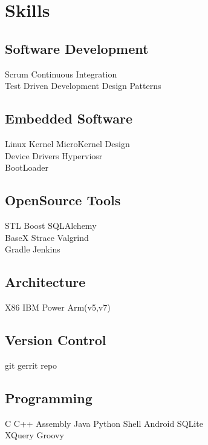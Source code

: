 \documentclass[letterpaper]{deedy-resume} %
\begin{document}
\begin{minipage}[t]{0.33\textwidth} %

\section{Skills}

\subsection{Software Development}
Scrum \textbullet{} Continuous Integration \textbullet{} \\
Test Driven Development \textbullet{} Design Patterns

\subsection{Embedded Software}
Linux Kernel \textbullet{} MicroKernel Design \textbullet{} \\
Device Drivers \textbullet{} Hyperviosr \textbullet{} \\
BootLoader

\subsection{OpenSource Tools}
STL \textbullet{} Boost \textbullet SQLAlchemy \textbullet \\
BaseX \textbullet{} Strace \textbullet{} Valgrind \textbullet{} \\
Gradle \textbullet{} Jenkins

\subsection{Architecture}
X86 \textbullet{} IBM Power \textbullet{} Arm(v5,v7)

\subsection{Version Control}
git \textbullet{} gerrit \textbullet{} repo

\subsection{Programming}
C \textbullet{} C++ \textbullet{} Assembly \textbullet{} Java \textbullet{} Python
Shell \textbullet{} Android \textbullet{} SQLite \textbullet \\
XQuery \textbullet{} Groovy


\end{minipage}
\end{document}
